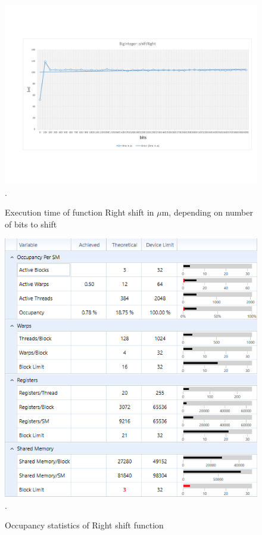 \documentclass[oneside,openright,12pt,final,en]{mgr}
\begin{document}
\begin{figure}[H]
	\centering
	\includegraphics[width=\textwidth,trim={0.5cm 2.8cm 0.4cm 2.8cm},clip]{rightshift.pdf}.
	\caption{Execution time of function Right shift in $\mu$m, depending on number of bits to shift}
	\label{fig:rightshift}
\end{figure}

\begin{figure}[H]
	\centering
	\includegraphics[width=\textwidth]{rightshift_occupancy}.
	\caption{Occupancy statistics of Right shift function}
	\label{fig:rightshift_occupancy}
\end{figure}
\end{document}
